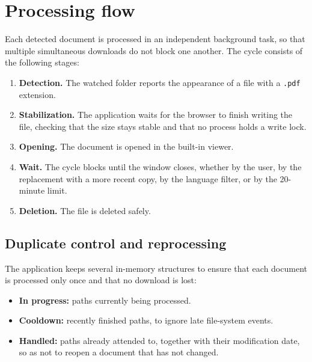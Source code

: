 \documentclass[11pt,a4paper]{article}
\begin{document}
\section{Processing flow}
Each detected document is processed in an independent background task, so that
multiple simultaneous downloads do not block one another. The cycle consists of
the following stages:

\begin{enumerate}[leftmargin=1.6em,itemsep=3pt]
  \item \textbf{Detection.} The watched folder reports the appearance of a file
        with a \texttt{.pdf} extension.
  \item \textbf{Stabilization.} The application waits for the browser to finish
        writing the file, checking that the size stays stable and that no process
        holds a write lock.
  \item \textbf{Opening.} The document is opened in the built-in viewer.
  \item \textbf{Wait.} The cycle blocks until the window closes, whether by the
        user, by the replacement with a more recent copy, by the language filter,
        or by the 20-minute limit.
  \item \textbf{Deletion.} The file is deleted safely.
\end{enumerate}

\subsection{Duplicate control and reprocessing}
The application keeps several in-memory structures to ensure that each document is
processed only once and that no download is lost:

\begin{itemize}[leftmargin=1.4em,itemsep=2pt]
  \item \textbf{In progress:} paths currently being processed.
  \item \textbf{Cooldown:} recently finished paths, to ignore late file-system
        events.
  \item \textbf{Handled:} paths already attended to, together with their
        modification date, so as not to reopen a document that has not changed.
\end{itemize}

\end{document}
